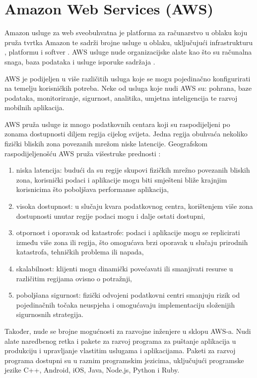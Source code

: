 \chapter{Amazon Web Services (AWS)}

Amazon usluge za web  sveobuhvatna je platforma za računarstvo u oblaku koju pruža tvrtka Amazon te sadrži brojne usluge u oblaku, uključujući infrastrukturu , platformu  i softver . AWS usluge nude organizacijske alate kao što su računalna snaga, baza podataka i usluge isporuke sadržaja \cite{what_is_aws}. 

AWS je podijeljen u više različitih usluga koje se mogu pojedinačno konfigurirati na temelju korisničkih potreba. Neke od usluga koje nudi AWS su: pohrana, baze podataka, monitoriranje, sigurnost, analitika, umjetna inteligencija te razvoj mobilnih aplikacija. 

AWS pruža usluge iz mnogo podatkovnih centara  koji su raspodijeljeni po zonama dostupnosti  diljem regija cijelog svijeta. Jedna regija obuhvaća nekoliko fizički bliskih zona povezanih mrežom niske latencije. Geografskom raspodijeljenošću AWS pruža višestruke prednosti \cite{aws_regions}:
\begin{enumerate}
	\item niska latencija: budući da su regije skupovi fizičkih mrežno povezanih bliskih zona, korisnički podaci i aplikacije mogu biti smješteni bliže krajnjim korisnicima što poboljšava performanse aplikacija,
	\item visoka dostupnost: u slučaju kvara podatkovnog centra, korištenjem više zona dostupnosti unutar regije podaci mogu i dalje ostati dostupni,
	\item otpornost i oporavak od katastrofe: podaci i aplikacije mogu se replicirati između više zona ili regija, što omogućava brzi oporavak u slučaju prirodnih katastrofa, tehničkih problema ili napada,
	\item skalabilnost: klijenti mogu dinamički povećavati ili smanjivati resurse u različitim regijama ovisno o potražnji,
	\item poboljšana sigurnost: fizički odvojeni podatkovni centri smanjuju rizik od pojedinačnih točaka neuspjeha i omogućavaju implementaciju složenijih sigurnosnih strategija.
\end{enumerate}

Također, nude se brojne mogućnosti za razvojne inženjere u sklopu AWS-a. Nudi alate naredbenog retka  i pakete za razvoj programa  za puštanje aplikacija u produkciju  i upravljanje vlastitim uslugama i aplikacijama. Paketi za razvoj programa dostupni su u raznim programskim jezicima, uključujući programske jezike C++, Android, iOS, Java, Node.js, Python i Ruby.

